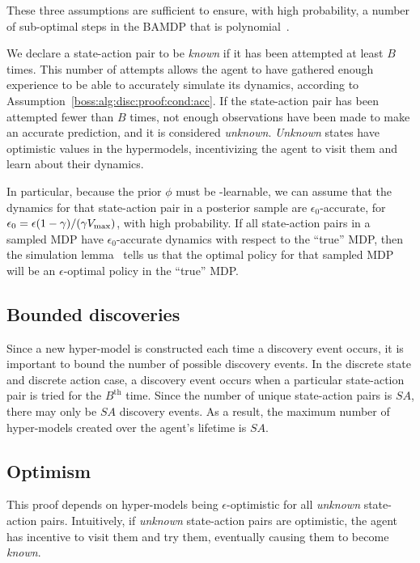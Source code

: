 These three assumptions are sufficient to ensure, with high probability, a number of sub-optimal steps in the BAMDP that is polynomial~\cite{lihong09pacmdp}.

We declare a state-action pair to be \emph{known} if it has been attempted at least $B$ times. This number of attempts allows the agent to have gathered enough experience to be able to accurately simulate its dynamics, according to Assumption~\ref{boss:alg:disc:proof:cond:acc}. If the state-action pair has been attempted fewer than $B$ times, not enough observations have been made to make an accurate prediction, and it is considered \emph{unknown}. \emph{Unknown} states have optimistic values in the hypermodels, incentivizing the agent to visit them and learn about their dynamics.

In particular, because the prior $\phi$ must be \bed-learnable, we can assume that the dynamics for that state-action pair in a posterior sample are $\epsilon_0$-accurate, for $\epsilon_0 = \epsilon(1-\gamma)/(\gamma V_{\rm max})$, with high probability. If all state-action pairs in a sampled MDP have $\epsilon_0$-accurate dynamics with respect to the ``true'' MDP, then the simulation lemma~\cite{kearns98,lihong09simlemma} tells us that the optimal policy for that sampled MDP will be an $\epsilon$-optimal policy in the ``true'' MDP.



\subsection{Bounded discoveries}

Since a new hyper-model is constructed each time a discovery event occurs, it is important to bound the number of possible discovery events. In the discrete state and discrete action case, a discovery event occurs when a particular state-action pair is tried for the $B^{\mbox{th}}$ time. Since the number of unique state-action pairs is $S A$, there may only be $S A$ discovery events. As a result, the maximum number of hyper-models created over the agent's lifetime is $S A$.

\subsection{Optimism}
\label{boss:alg:disc:proof:opt}

This proof depends on hyper-models being $\epsilon$-optimistic for all \emph{unknown} state-action pairs. Intuitively, if \emph{unknown} state-action pairs are optimistic, the agent has incentive to visit them and try them, eventually causing them to become \emph{known}.

